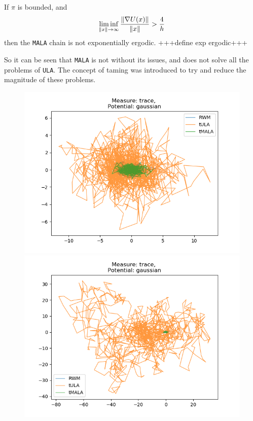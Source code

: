 \begin{theorem}
	If \(\pi\) is bounded, and
		\[\liminf_{\|x\|\to \infty} \frac{\|\nabla U(x)\|}{\|x\|} > \frac{4}{h}\]
	then the \texttt{MALA} chain is not exponentially ergodic. +++define exp ergodic+++
\end{theorem}
So it can be seen that \texttt{MALA} is not without its issues, and does not solve all the problems of \texttt{ULA}. The concept of taming was introduced to try and reduce the magnitude of these problems.
\begin{figure}[H]
\centering
  \begin{minipage}[b]{0.49\textwidth}
  \centering
    \includegraphics[width=\textwidth]{Figures/tula_tmala_step_1.png}
  \end{minipage} %
  \begin{minipage}[b]{0.49\textwidth}
  \centering
    \includegraphics[width=\textwidth]{Figures/tula_tmala_step_10.png}

\end{minipage}
\end{figure}
